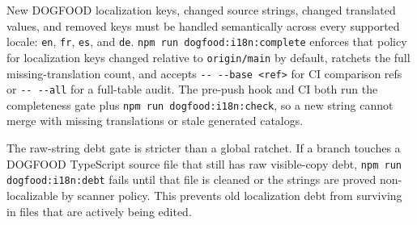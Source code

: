 New DOGFOOD localization keys, changed source strings, changed translated values, and removed keys must be handled semantically across every supported locale: \texttt{e\allowbreak{}n}, \texttt{f\allowbreak{}r}, \texttt{e\allowbreak{}s}, and \texttt{d\allowbreak{}e}. \texttt{n\allowbreak{}p\allowbreak{}m\allowbreak{} \allowbreak{}r\allowbreak{}u\allowbreak{}n\allowbreak{} \allowbreak{}d\allowbreak{}o\allowbreak{}g\allowbreak{}f\allowbreak{}o\allowbreak{}o\allowbreak{}d\allowbreak{}:\allowbreak{}i\allowbreak{}1\allowbreak{}8\allowbreak{}n\allowbreak{}:\allowbreak{}c\allowbreak{}o\allowbreak{}m\allowbreak{}p\allowbreak{}l\allowbreak{}e\allowbreak{}t\allowbreak{}e} enforces that policy for localization keys changed relative to \texttt{o\allowbreak{}r\allowbreak{}i\allowbreak{}g\allowbreak{}i\allowbreak{}n\allowbreak{}/\allowbreak{}m\allowbreak{}a\allowbreak{}i\allowbreak{}n} by default, ratchets the full missing-translation count, and accepts \texttt{-\allowbreak{}-\allowbreak{} \allowbreak{}-\allowbreak{}-\allowbreak{}b\allowbreak{}a\allowbreak{}s\allowbreak{}e\allowbreak{} \allowbreak{}<\allowbreak{}r\allowbreak{}e\allowbreak{}f\allowbreak{}>} for CI comparison refs or \texttt{-\allowbreak{}-\allowbreak{} \allowbreak{}-\allowbreak{}-\allowbreak{}a\allowbreak{}l\allowbreak{}l} for a full-table audit. The pre-push hook and CI both run the completeness gate plus \texttt{n\allowbreak{}p\allowbreak{}m\allowbreak{} \allowbreak{}r\allowbreak{}u\allowbreak{}n\allowbreak{} \allowbreak{}d\allowbreak{}o\allowbreak{}g\allowbreak{}f\allowbreak{}o\allowbreak{}o\allowbreak{}d\allowbreak{}:\allowbreak{}i\allowbreak{}1\allowbreak{}8\allowbreak{}n\allowbreak{}:\allowbreak{}c\allowbreak{}h\allowbreak{}e\allowbreak{}c\allowbreak{}k}, so a new string cannot merge with missing translations or stale generated catalogs.

The raw-string debt gate is stricter than a global ratchet. If a branch touches a DOGFOOD TypeScript source file that still has raw visible-copy debt, \texttt{n\allowbreak{}p\allowbreak{}m\allowbreak{} \allowbreak{}r\allowbreak{}u\allowbreak{}n\allowbreak{} \allowbreak{}d\allowbreak{}o\allowbreak{}g\allowbreak{}f\allowbreak{}o\allowbreak{}o\allowbreak{}d\allowbreak{}:\allowbreak{}i\allowbreak{}1\allowbreak{}8\allowbreak{}n\allowbreak{}:\allowbreak{}d\allowbreak{}e\allowbreak{}b\allowbreak{}t} fails until that file is cleaned or the strings are proved non-localizable by scanner policy. This prevents old localization debt from surviving in files that are actively being edited.

